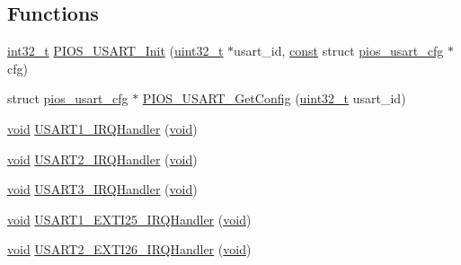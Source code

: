 \subsection*{Functions}
\begin{DoxyCompactItemize}
\item 
\hyperlink{group___n_a_m_e_gafd12020da5a235dfcf0c3c748fb5baed}{int32\-\_\-t} \hyperlink{group___p_i_o_s___u_s_a_r_t_ga437fb84f2fc14d2db87aea8b53a0a73c}{P\-I\-O\-S\-\_\-\-U\-S\-A\-R\-T\-\_\-\-Init} (\hyperlink{stdint_8h_a435d1572bf3f880d55459d9805097f62}{uint32\-\_\-t} $\ast$usart\-\_\-id, \hyperlink{group___n_a_m_e_ga7ae6d0e43244213b34de2c2b9aa30da6}{const} struct \hyperlink{structpios__usart__cfg}{pios\-\_\-usart\-\_\-cfg} $\ast$cfg)
\item 
struct \hyperlink{structpios__usart__cfg}{pios\-\_\-usart\-\_\-cfg} $\ast$ \hyperlink{group___p_i_o_s___u_s_a_r_t_ga950365bc3d27bf7c436e8e549128a1ad}{P\-I\-O\-S\-\_\-\-U\-S\-A\-R\-T\-\_\-\-Get\-Config} (\hyperlink{stdint_8h_a435d1572bf3f880d55459d9805097f62}{uint32\-\_\-t} usart\-\_\-id)
\item 
\hyperlink{group___n_a_m_e_ga18028b8badbf1ea7e704ccac3c488e82}{void} \hyperlink{group___p_i_o_s___u_s_a_r_t_ga7139cd4baabbbcbab0c1fe6d7d4ae1cc}{U\-S\-A\-R\-T1\-\_\-\-I\-R\-Q\-Handler} (\hyperlink{group___n_a_m_e_ga18028b8badbf1ea7e704ccac3c488e82}{void})
\item 
\hyperlink{group___n_a_m_e_ga18028b8badbf1ea7e704ccac3c488e82}{void} \hyperlink{group___p_i_o_s___u_s_a_r_t_ga0ca6fd0e6f77921dd1123539857ba0a8}{U\-S\-A\-R\-T2\-\_\-\-I\-R\-Q\-Handler} (\hyperlink{group___n_a_m_e_ga18028b8badbf1ea7e704ccac3c488e82}{void})
\item 
\hyperlink{group___n_a_m_e_ga18028b8badbf1ea7e704ccac3c488e82}{void} \hyperlink{group___p_i_o_s___u_s_a_r_t_ga0d108a3468b2051548183ee5ca2158a0}{U\-S\-A\-R\-T3\-\_\-\-I\-R\-Q\-Handler} (\hyperlink{group___n_a_m_e_ga18028b8badbf1ea7e704ccac3c488e82}{void})
\item 
\hyperlink{group___n_a_m_e_ga18028b8badbf1ea7e704ccac3c488e82}{void} \hyperlink{group___p_i_o_s___u_s_a_r_t_ga9da740f6a7dda252db44255f54a3bee3}{U\-S\-A\-R\-T1\-\_\-\-E\-X\-T\-I25\-\_\-\-I\-R\-Q\-Handler} (\hyperlink{group___n_a_m_e_ga18028b8badbf1ea7e704ccac3c488e82}{void})
\item 
\hyperlink{group___n_a_m_e_ga18028b8badbf1ea7e704ccac3c488e82}{void} \hyperlink{group___p_i_o_s___u_s_a_r_t_ga4897c2dbb8e8ae70938922276f95800b}{U\-S\-A\-R\-T2\-\_\-\-E\-X\-T\-I26\-\_\-\-I\-R\-Q\-Handler} (\hyperlink{group___n_a_m_e_ga18028b8badbf1ea7e704ccac3c488e82}{void})

\end{DoxyCompactItemize}
